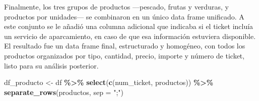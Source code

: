 \documentclass[,,,oneauthor,pdftex]{Definitions/mdpi}
\newenvironment{Shaded}{\begin{snugshade}}{\end{snugshade}}
\newcommand{\AttributeTok}[1]{\textcolor[rgb]{0.13,0.29,0.53}{#1}}
\newcommand{\FunctionTok}[1]{\textcolor[rgb]{0.13,0.29,0.53}{\textbf{#1}}}
\newcommand{\NormalTok}[1]{#1}
\newcommand{\OtherTok}[1]{\textcolor[rgb]{0.56,0.35,0.01}{#1}}
\newcommand{\SpecialCharTok}[1]{\textcolor[rgb]{0.81,0.36,0.00}{\textbf{#1}}}
\newcommand{\StringTok}[1]{\textcolor[rgb]{0.31,0.60,0.02}{#1}}
\begin{document}
Finalmente, los tres grupos de productos ---pescado, frutas y verduras,
y productos por unidades--- se combinaron en un único data frame
unificado. A este conjunto se le añadió una columna adicional que
indicaba si el ticket incluía un servicio de aparcamiento, en caso de
que esa información estuviera disponible. El resultado fue un data frame
final, estructurado y homogéneo, con todos los productos organizados por
tipo, cantidad, precio, importe y número de ticket, listo para su
análisis posterior.

\begin{Shaded}
\begin{Highlighting}[]
\NormalTok{df\_producto }\OtherTok{\textless{}{-}}\NormalTok{ df }\SpecialCharTok{\%\textgreater{}\%} \FunctionTok{select}\NormalTok{(}\FunctionTok{c}\NormalTok{(num\_ticket, productos)) }\SpecialCharTok{\%\textgreater{}\%} 
  \FunctionTok{separate\_rows}\NormalTok{(productos, }\AttributeTok{sep =} \StringTok{";"}\NormalTok{)}
\end{Highlighting}
\end{Shaded}
\end{document}
